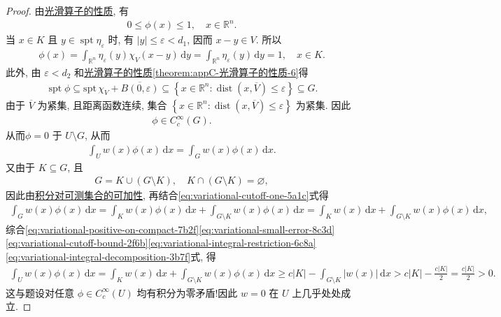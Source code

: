 \documentclass[../../main.tex]{subfiles}
\begin{document}
\begin{proof}
由\hyperref[theorem:appC-光滑算子的性质]{光滑算子的性质}, 有
\begin{align}
0\leqslant\phi(x)\leqslant 1,
\quad x\in\mathbb{R}^n.
\label{eq:variational-cutoff-bound-2f6b}
\end{align}
当 $x\in K$ 且 $y\in\operatorname{spt}\eta_\varepsilon$ 时, 有 $|y|\leqslant\varepsilon<d_1$, 因而 $x-y\in V$. 所以
\begin{align}
\phi(x)
=
\int_{\mathbb{R}^n}
\eta_\varepsilon(y)\chi_V(x-y)\,\mathrm{d}y=
\int_{\mathbb{R}^n}\eta_\varepsilon(y)\,\mathrm{d}y=1,
\quad x\in K.\label{eq:variational-cutoff-one-5a1c}
\end{align}
此外, 由 $\varepsilon<d_2$ 和\hyperref[theorem:appC-光滑算子的性质]{光滑算子的性质\ref{theorem:appC-光滑算子的性质-6}}得
\begin{align*}
\operatorname{spt}\phi\subseteq \mathrm{spt}\,\chi _V+\overline{B\left( 0,\varepsilon \right) }
\subseteq
\left\{
x\in\mathbb{R}^n:
\operatorname{dist}(x,\overline{V})\leqslant\varepsilon
\right\}\subseteq G.
\end{align*}
由于 $\overline{V}$ 为紧集, 且距离函数连续, 集合
$\left\{
x\in\mathbb{R}^n:
\operatorname{dist}(x,\overline{V})\leqslant\varepsilon
\right\}$
为紧集. 因此
\begin{align}
\phi\in C_c^\infty(G).
\label{eq:variational-cutoff-sptort-9d4e}
\end{align}
从而$\phi=0$ 于 $U\setminus G$, 从而
\begin{align}
\int_U w(x)\phi(x)\,\mathrm{d}x
=
\int_G w(x)\phi(x)\,\mathrm{d}x.
\label{eq:variational-integral-restriction-6c8a}
\end{align}
又由于 $K\subseteq G$, 且
\begin{align*}
G=K\cup(G\setminus K),
\quad K\cap(G\setminus K)=\varnothing,
\end{align*}
因此由\hyperref[Real Analysis-theorem:积分对定义域的可数可加性]{积分对可测集合的可加性}, 再结合\eqref{eq:variational-cutoff-one-5a1c}式得
\begin{align}
\int_G w(x)\phi(x)\,\mathrm{d}x
=
\int_K w(x)\phi(x)\,\mathrm{d}x
+\int_{G\setminus K}w(x)\phi(x)\,\mathrm{d}x
=
\int_K w(x)\,\mathrm{d}x
+\int_{G\setminus K}w(x)\phi(x)\,\mathrm{d}x,
\label{eq:variational-integral-decomposition-3b7f}
\end{align}
综合\eqref{eq:variational-positive-on-compact-7b2f}\eqref{eq:variational-small-error-8c3d}\eqref{eq:variational-cutoff-bound-2f6b}\eqref{eq:variational-integral-restriction-6c8a}\eqref{eq:variational-integral-decomposition-3b7f}式, 得
\begin{align*}
\int_U w(x)\phi(x)\,\mathrm{d}x
=
\int_K w(x)\,\mathrm{d}x
+\int_{G\setminus K}w(x)\phi(x)\,\mathrm{d}x
\geqslant
c|K|-\int_{G\setminus K}|w(x)|\,\mathrm{d}x
>
c|K|-\frac{c|K|}{2}
=\frac{c|K|}{2}>0.
\end{align*}
这与题设对任意 $\phi\in C_c^\infty(U)$ 均有积分为零矛盾!因此 $w=0$ 在 $U$ 上几乎处处成立.
\end{proof}
\end{document}
